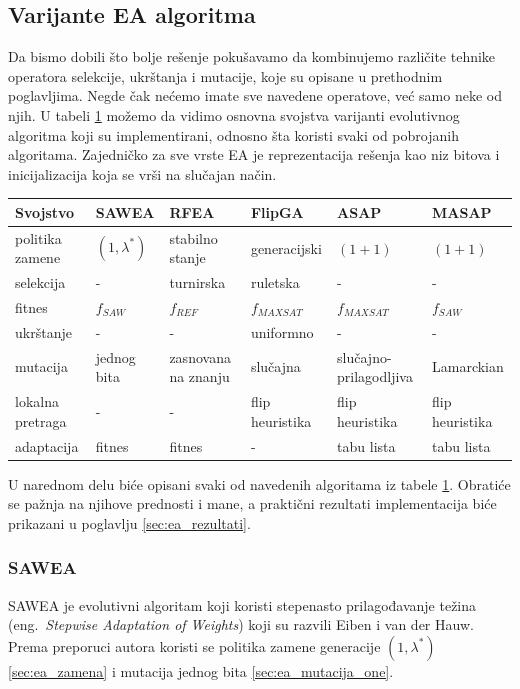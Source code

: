 \documentclass[a4paper]{article}
\begin{document}
\subsection{Varijante EA algoritma}
\label{sec:ea_varijante}
Da bismo dobili što bolje rešenje pokušavamo da kombinujemo različite tehnike 
operatora selekcije, ukrštanja i mutacije, koje su opisane u prethodnim poglavljima. 
Negde čak nećemo imate sve navedene operatove, već samo neke od njih. 
U tabeli \ref{tab:EA} možemo da vidimo osnovna svojstva varijanti evolutivnog algoritma 
koji su implementirani, odnosno šta koristi svaki od pobrojanih algoritama.
Zajedničko za sve vrste EA je reprezentacija rešenja kao niz bitova i
inicijalizacija koja se vrši na slučajan način.
 
\begin{table}[h!]
\centering
{}\label{tab:EA} 
\begin{tabular}{ |p{2cm}|p{2cm}|p{2cm}|p{2cm}|p{2cm}|p{2cm}|}
 \hline
 Svojstvo & SAWEA & RFEA & FlipGA & ASAP & MASAP \\
 \hline
 politika zamene & $(1, \lambda^*)$ & stabilno \break stanje & generacijski & $(1 + 1)$
 & $(1 + 1)$ \\
 selekcija & - & turnirska & ruletska & - & - \\
 fitnes &	$f_{SAW}$ & $f_{REF}$ & $f_{MAXSAT}$ & $f_{MAXSAT}$ & $f_{SAW}$\\
 ukrštanje & - & - & uniformno & - & - \\
 mutacija & jednog bita & zasnovana na znanju & slučajna & slučajno-prilagodljiva 
 & Lamarckian \\
 lokalna \break pretraga & - & - & flip \break heuristika & flip \break heuristika &
 flip \break heuristika \\
 adaptacija & fitnes & fitnes &  - & tabu lista & tabu lista \\
 \hline
\end{tabular}
\end{table}


U narednom delu biće opisani svaki od navedenih algoritama iz tabele \ref{tab:EA}.
Obratiće se pažnja na njihove prednosti i mane, a praktični rezultati implementacija
biće prikazani u poglavlju \ref{sec:ea_rezultati}.


\subsubsection{SAWEA}
\label{sec:ea_sawea}
SAWEA je evolutivni algoritam koji koristi stepenasto prilagođavanje težina 
(eng.~{\em Stepwise Adaptation of Weights}) \cite{ea_with_table, ea_without_table} 
koji su razvili Eiben i van der Hauw. 
Prema preporuci autora koristi se politika zamene generacije $(1,\lambda^*)$
 \ref{sec:ea_zamena} i mutacija jednog bita \ref{sec:ea_mutacija_one}. \\
\end{document}
